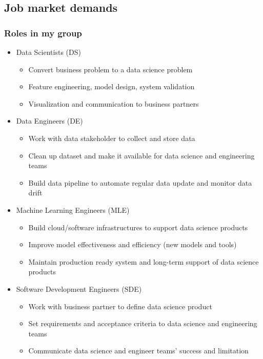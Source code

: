 \documentclass[aspectratio=169,xcolor=x11names,table]{beamer}
\begin{document}
\subsection{Job market demands}
\begin{frame}
	\frametitle{Roles in my group}
	\begin{itemize}
		\item<1> Data Scientists (DS)
			\begin{itemize}
				\item Convert business problem to a data science problem
				\item Feature engineering, model design, system validation
				\item Visualization and communication to business partners
			\end{itemize}
		\item<2> Data Engineers (DE)
			\begin{itemize}
				\item Work with data stakeholder to collect and store data
				\item Clean up dataset and make it available for data science and engineering teams
				\item Build data pipeline to automate regular data update and monitor data drift
			\end{itemize}
		\item<3> Machine Learning Engineers (MLE)
			\begin{itemize}
				\item Build cloud/software infrastructures to support data science products
				\item Improve model effectiveness and efficiency (new models and tools)
				\item Maintain production ready system and long-term support of data science products
			\end{itemize}
		\item<4> Software Development Engineers (SDE)
			\begin{itemize}
				\item Work with business partner to define data science product
				\item Set requirements and acceptance criteria to data science and engineering teams
				\item Communicate data science and engineer teams' success and limitation
			\end{itemize}
	\end{itemize}
\end{frame}
\end{document}
